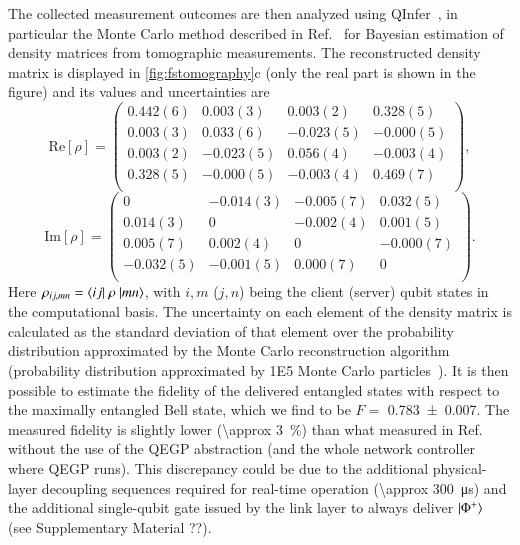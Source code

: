 The collected measurement outcomes are then analyzed using QInfer~\cite{granade_2017_qinfer}, in
particular the Monte Carlo method described in Ref.~\cite{granade_2016_practical} for Bayesian
estimation of density matrices from tomographic measurements. The reconstructed density matrix is
displayed in \cref{fig:fstomography}c (only the real part is shown in the figure) and its values and
uncertainties are
%
\begin{equation*}
    \mathrm{Re}[\rho] = \begin{pmatrix}
        0.442(6) & 0.003(3)  & 0.003(2)  & 0.328(5)  \\
        0.003(3) & 0.033(6)  & -0.023(5) & -0.000(5) \\
        0.003(2) & -0.023(5) & 0.056(4)  & -0.003(4) \\
        0.328(5) & -0.000(5) & -0.003(4) & 0.469(7)  \\
    \end{pmatrix},
\end{equation*}
%
\begin{equation*}
    \mathrm{Im}[\rho] = \begin{pmatrix}
        0         & -0.014(3) & -0.005(7) & 0.032(5)  \\
        0.014(3)  & 0         & -0.002(4) & 0.001(5)  \\
        0.005(7)  & 0.002(4)  & 0         & -0.000(7) \\
        -0.032(5) & -0.001(5) & 0.000(7)  & 0         \\
    \end{pmatrix}.
\end{equation*}
Here $\rho_{ij, mn} = \braket{ij|\ \rho\ |mn}$, with $i,m$ ($j,n$) being the client (server) qubit
states in the computational basis. The uncertainty on each element of the density matrix is
calculated as the standard deviation of that element over the probability distribution approximated
by the Monte Carlo reconstruction algorithm (probability distribution approximated by \num{1E5}
Monte Carlo particles~\cite{granade_2016_practical}). It is then possible to estimate the fidelity
of the delivered entangled states with respect to the maximally entangled Bell state, which we find
to be $F =$ \num{0.783(7)}. The measured fidelity is slightly lower (\qty{\approx 3}{\percent}) than
what measured in Ref.~\cite{pompili_2021_multinode} without the use of the QEGP abstraction (and
the whole network controller where QEGP runs). This discrepancy could be due to the additional
physical-layer decoupling sequences required for real-time operation (\qty{\approx 300}{\us}) and
the additional single-qubit gate issued by the link layer to always deliver $\ket{\Phi^+}$ (see
Supplementary Material ??).

